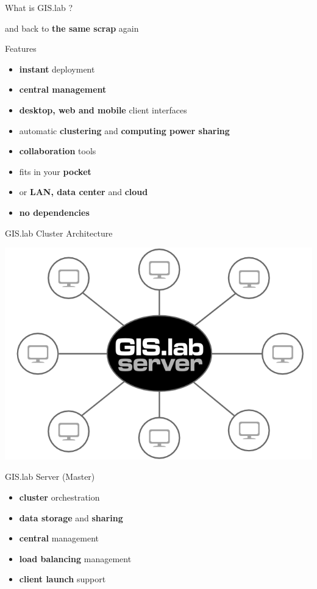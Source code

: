\documentclass[12pt]{beamer}
\begin{document}
\begin{frame}{What is GIS.lab ?}
	\begin{center}
		and back to \textbf{the same scrap} again
	\end{center}
\end{frame}

\begin{frame}{Features}
	\begin{itemize}[<+->]
		\item \textbf{instant} deployment
		\item \textbf{central management}
		\item \textbf{desktop, web and mobile} client interfaces
		\item automatic \textbf{clustering} and \textbf{computing power sharing}
		\item \textbf{collaboration} tools
		\item fits in your \textbf{pocket}
		\item or \textbf{LAN, data center} and \textbf{cloud}
		\item \textbf{no dependencies}
	\end{itemize}
\end{frame}

\begin{frame}{GIS.lab Cluster Architecture}
	\begin{center}
		\includegraphics[keepaspectratio=true,height=0.8\textheight]{images/gislab-cluster-architecture.png}
	\end{center}
\end{frame}

\begin{frame}{GIS.lab Server (Master)}
	\begin{itemize}
		\item \textbf{cluster} orchestration
		\item \textbf{data storage} and \textbf{sharing}
		\item \textbf{central} management
		\item \textbf{load balancing} management
		\item \textbf{client launch} support
	\end{itemize}
\end{frame}
\end{document}
